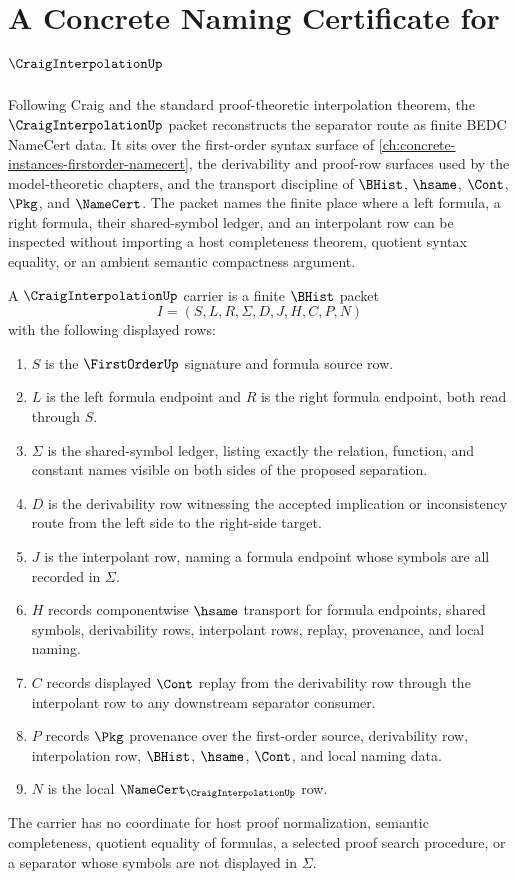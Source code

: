 \chapter{A Concrete Naming Certificate for $\CraigInterpolationUp$}
\label{ch:concrete-instances-craig-interpolation-namecert}

Following Craig and the standard proof-theoretic interpolation theorem, the $\CraigInterpolationUp$ packet reconstructs the separator route as finite BEDC NameCert data. It sits over the first-order syntax surface of \autoref{ch:concrete-instances-firstorder-namecert}, the derivability and proof-row surfaces used by the model-theoretic chapters, and the transport discipline of $\BHist$, $\hsame$, $\Cont$, $\Pkg$, and $\NameCert$. The packet names the finite place where a left formula, a right formula, their shared-symbol ledger, and an interpolant row can be inspected without importing a host completeness theorem, quotient syntax equality, or an ambient semantic compactness argument.

\begin{definition}
\label{def:craig-interpolation-carrier}
A $\CraigInterpolationUp$ carrier is a finite $\BHist$ packet
$$
I=(S,L,R,\Sigma,D,J,H,C,P,N)
$$
with the following displayed rows:
\begin{enumerate}
\item $S$ is the $\FirstOrderUp$ signature and formula source row.
\item $L$ is the left formula endpoint and $R$ is the right formula endpoint, both read through $S$.
\item $\Sigma$ is the shared-symbol ledger, listing exactly the relation, function, and constant names visible on both sides of the proposed separation.
\item $D$ is the derivability row witnessing the accepted implication or inconsistency route from the left side to the right-side target.
\item $J$ is the interpolant row, naming a formula endpoint whose symbols are all recorded in $\Sigma$.
\item $H$ records componentwise $\hsame$ transport for formula endpoints, shared symbols, derivability rows, interpolant rows, replay, provenance, and local naming.
\item $C$ records displayed $\Cont$ replay from the derivability row through the interpolant row to any downstream separator consumer.
\item $P$ records $\Pkg$ provenance over the first-order source, derivability row, interpolation row, $\BHist$, $\hsame$, $\Cont$, and local naming data.
\item $N$ is the local $\NameCert_{\CraigInterpolationUp}$ row.
\end{enumerate}
The carrier has no coordinate for host proof normalization, semantic completeness, quotient equality of formulas, a selected proof search procedure, or a separator whose symbols are not displayed in $\Sigma$.
\end{definition}

